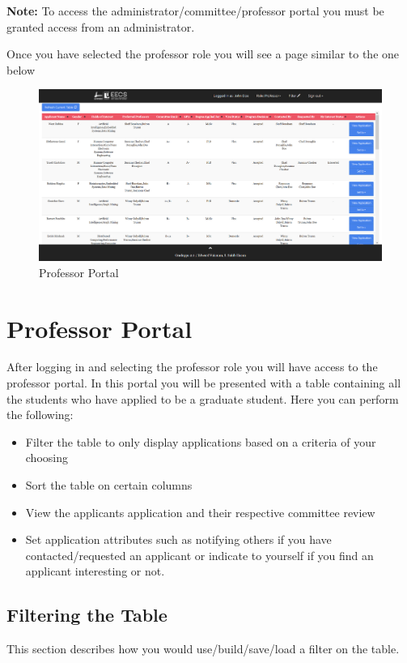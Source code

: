 \documentclass[fontsize=12pt,paper=letter,twoside]{scrartcl}
\begin{document}
\noindent \textbf{Note:} To access the administrator/committee/professor portal you must be granted access from an administrator.

\clearpage

Once you have selected the professor role you will see a page similar to the one below

\begin{figure}[!htb]
\begin{center}
\includegraphics[width=.99\textwidth]{images/professor.png}
\end{center}
\caption{Professor Portal}
\label{fig:professor}
\end{figure}

\clearpage
\section{Professor Portal}
After logging in and selecting the professor role you will have access to the professor portal. In this portal you will be presented with a table containing all the students who have applied to be a graduate student. Here you can perform the following:
\begin{itemize}
\item Filter the table to only display applications based on a criteria of your choosing
\item Sort the table on certain columns
\item View the applicants application and their respective committee review
\item Set application attributes such as notifying others if you have contacted/requested an applicant or indicate to yourself if you find an applicant interesting or not.
\end{itemize} 
\subsection{Filtering the Table}
This section describes how you would use/build/save/load a filter on the table.
\end{document}

